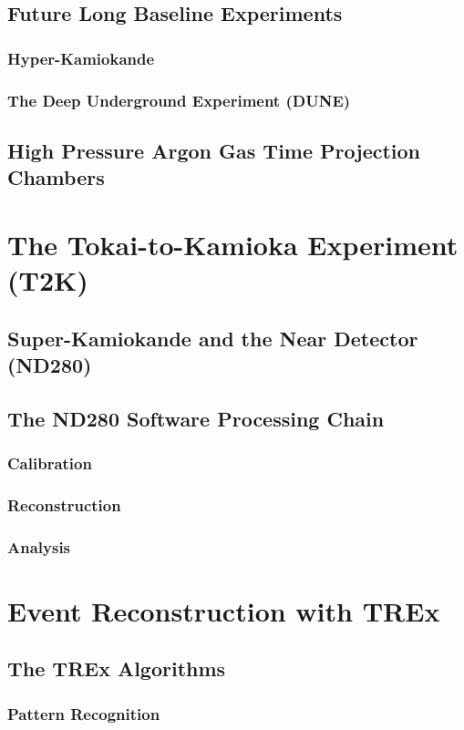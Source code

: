 \documentclass[a4paper, 11pt]{report}
\begin{document}
\section{Future Long Baseline Experiments}
\subsection{Hyper-Kamiokande}
\subsection{The Deep Underground Experiment (DUNE)}
\section{High Pressure Argon Gas Time Projection Chambers}


\chapter{The Tokai-to-Kamioka Experiment (T2K)}
\section{Super-Kamiokande and the Near Detector (ND280)}
\section{The ND280 Software Processing Chain}
\subsection{Calibration}
\subsection{Reconstruction}
\subsection{Analysis}


\chapter{Event Reconstruction with TREx}
\section{The TREx Algorithms}
\subsection{Pattern Recognition}
\end{document}
